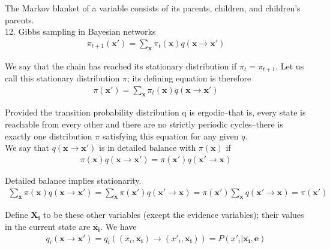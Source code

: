 \documentclass[12pt]{article}
\begin{document}
The Markov blanket of a variable consists of its parents, children, and children's parents. \\

12. Gibbs sampling in Bayesian networks
\begin{eqnarray*}
\pi_{t+1}(\boldsymbol{x'})
= \sum_{\boldsymbol{x}} \pi_t(\boldsymbol{x}) q(\boldsymbol{x} 
  \rightarrow \boldsymbol{x'})
\end{eqnarray*}

We say that the chain has reached its stationary distribution if $\pi_t = \pi_{t+1}$. Let us call this stationary distribution $\pi$; its defining equation is therefore
\begin{eqnarray*}
\pi(\boldsymbol{x'})
= \sum_{\boldsymbol{x}} \pi_t(\boldsymbol{x}) q(\boldsymbol{x}
  \rightarrow \boldsymbol{x'})
\end{eqnarray*}

Provided the transition probability distribution q is ergodic--that is, every state is reachable from every other and there are no strictly periodic cycles--there is exactly one distribution $\pi$ satisfying this equation for any given $q$. \\

We say that $q(\boldsymbol{x} \rightarrow \boldsymbol{x'})$ is in detailed balance with $\pi(\boldsymbol{x})$ if 
\begin{eqnarray*}
\pi(\boldsymbol{x}) q(\boldsymbol{x} \rightarrow \boldsymbol{x'})
= \pi(\boldsymbol{x'}) q(\boldsymbol{x'} \rightarrow \boldsymbol{x})
\end{eqnarray*}

Detailed balance implies stationarity.
\begin{eqnarray*}
\sum_{\boldsymbol{x}} \pi(\boldsymbol{x}) q(\boldsymbol{x} \rightarrow \boldsymbol{x'}) = \sum_{\boldsymbol{x}} \pi(\boldsymbol{x'}) q(\boldsymbol{x'} \rightarrow \boldsymbol{x}) = \pi(\boldsymbol{x'}) \sum_{\boldsymbol{x}} q(\boldsymbol{x'} \rightarrow \boldsymbol{x}) =\pi(\boldsymbol{x'})
\end{eqnarray*}

Define $\overline{\boldsymbol{X_i}}$ to be these other variables (except the evidence variables); their values in the current state are $\overline{\boldsymbol{x_i}}$. We have
\begin{eqnarray*}
q_i(\boldsymbol{x} \rightarrow \boldsymbol{x'})
= q_i((x_i, \overline{\boldsymbol{x_i}}) \rightarrow 
  (x'_i, \overline{\boldsymbol{x_i}}))
= P(x'_i | \overline{\boldsymbol{x_i}}, \boldsymbol{e})
\end{eqnarray*}
\end{document}
